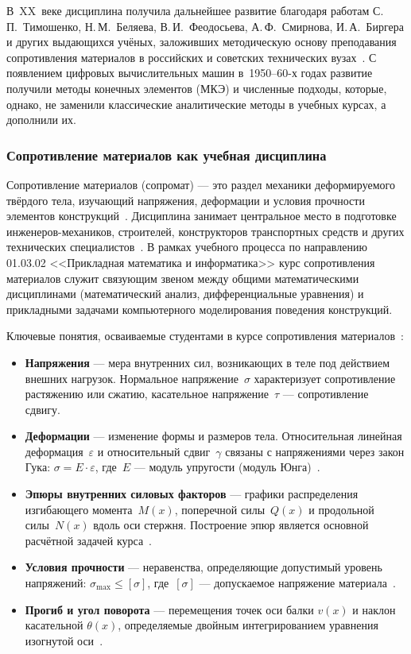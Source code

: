 В~XX~веке дисциплина получила дальнейшее развитие благодаря работам С.\,П.~Тимошенко, Н.\,М.~Беляева, В.\,И.~Феодосьева, А.\,Ф.~Смирнова, И.\,А.~Биргера и других выдающихся учёных, заложивших методическую основу преподавания сопротивления материалов в российских и советских технических вузах~\cite{belyaev, feodosev, pisarenko}. С появлением цифровых вычислительных машин в~1950--60-х годах развитие получили методы конечных элементов (МКЭ) и численные подходы, которые, однако, не заменили классические аналитические методы в учебных курсах, а дополнили их.

\subsubsection{Сопротивление материалов как учебная дисциплина}

Сопротивление материалов (сопромат) --- это раздел механики деформируемого твёрдого тела, изучающий напряжения, деформации и условия прочности элементов конструкций~\cite{feodosev, aleksandrov}. Дисциплина занимает центральное место в подготовке инженеров-механиков, строителей, конструкторов транспортных средств и других технических специалистов~\cite{darkov, stepin}. В рамках учебного процесса по направлению 01.03.02 <<Прикладная математика и информатика>> курс сопротивления материалов служит связующим звеном между общими математическими дисциплинами (математический анализ, дифференциальные уравнения) и прикладными задачами компьютерного моделирования поведения конструкций.

Ключевые понятия, осваиваемые студентами в курсе сопротивления материалов~\cite{belyaev, pisarenko}:

\begin{itemize}
  \item \textbf{Напряжения} --- мера внутренних сил, возникающих в теле под действием внешних нагрузок. Нормальное напряжение~$\sigma$ характеризует сопротивление растяжению или сжатию, касательное напряжение~$\tau$ --- сопротивление сдвигу.
  \item \textbf{Деформации} --- изменение формы и размеров тела. Относительная линейная деформация~$\varepsilon$ и относительный сдвиг~$\gamma$ связаны с напряжениями через закон Гука: $\sigma = E \cdot \varepsilon$, где~$E$ --- модуль упругости (модуль Юнга)~\cite{timoshenko1983}.
  \item \textbf{Эпюры внутренних силовых факторов} --- графики распределения изгибающего момента~$M(x)$, поперечной силы~$Q(x)$ и продольной силы~$N(x)$ вдоль оси стержня. Построение эпюр является основной расчётной задачей курса~\cite{gere2018, hibbeler2016}.
  \item \textbf{Условия прочности} --- неравенства, определяющие допустимый уровень напряжений: $\sigma_{\max} \leq [\sigma]$, где~$[\sigma]$ --- допускаемое напряжение материала~\cite{beer2020}.
  \item \textbf{Прогиб и угол поворота} --- перемещения точек оси балки $v(x)$ и наклон касательной $\theta(x)$, определяемые двойным интегрированием уравнения изогнутой оси~\cite{popov1998}.
\end{itemize}

